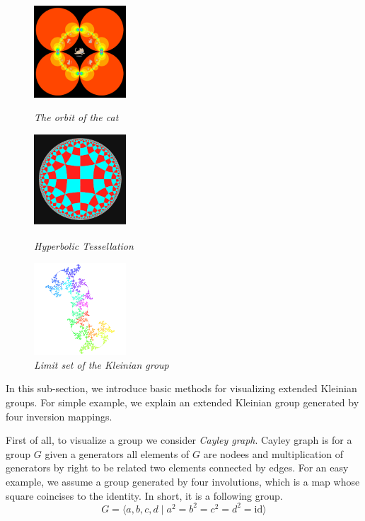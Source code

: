 \begin{figure}[htbp]
 \begin{minipage}[t]{0.3333\hsize}
  \center
  \includegraphics[height=1.35in, keepaspectratio]{img/preparation/basic/catCircleOrbit.png}
  \caption{\textit{The orbit of the cat}}
  \label{fig:orbitCat}
  \hspace*{\fill}
 \end{minipage}
 \begin{minipage}[t]{0.3333\hsize}
  \center
  \includegraphics[height=1.35in, keepaspectratio]{img/preparation/basic/hyperbolicTessellation.png}
  \caption{\textit{Hyperbolic Tessellation}}
  \label{fig:hypTiling}
  \hspace*{\fill}
 \end{minipage}
 \begin{minipage}[t]{0.3333\hsize}
  \center
  \includegraphics[height=1.35in, keepaspectratio]{img/preparation/limitSet/limit.png}
  \caption{\textit{Limit set of the Kleinian group}}
  \label{fig:limit}
  \hspace*{\fill}
 \end{minipage}
\end{figure}

\noindent In this sub-section, we introduce basic methods for
visualizing extended Kleinian groups.
For simple example, we explain an extended Kleinian group generated by
four inversion mappings.

First of all, to visualize a group we consider \textit{Cayley graph}.
Cayley graph is for a group $G$ given a generators
all elements of $G$ are nodees and multiplication of generators by
right to be related two elements connected by edges.
For an easy example, we assume a group generated by four
involutions, which is a map whose square coincises to the identity.
In short, it is a following group.
\[ G=\langle a,b,c,d \mid a^2=b^2=c^2=d^2 = \mathrm{id} \rangle \]

